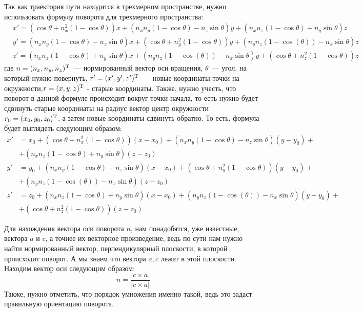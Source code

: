 \documentclass[a4paper,12pt]{article}
\begin{document}
Так как траектория пути находится в трехмерном пространстве, нужно использовать формулу поворота для трехмерного пространства:
\begin{align*}\label{rotation_formula}
        &x' = (\cos{\theta} + n_x^2(1-\cos{\theta}))x + (n_x n_y (1-\cos{\theta}) - n_z\sin{\theta})y + (n_x n_z(1-\cos{\theta}) + n_y \sin{\theta})z \\
        &y' = (n_x n_y (1-\cos{\theta}) - n_z\sin{\theta})x + (\cos{\theta} + n_y^2(1-\cos{\theta}))y + (n_y n_z(1-\cos(\theta)) - n_x\sin{\theta})z\\
        &z' = (n_x n_z(1-\cos{\theta}) + n_y \sin{\theta})x + (n_y n_z(1-\cos(\theta)) - n_x\sin{\theta})y + (\cos{\theta} + n_z^2(1-\cos{\theta}))z
\end{align*}
где $n = (n_x,n_y,n_z)^\text{\textup{T}}$~--- нормированный вектор оси вращения, $\theta$~--- угол, на который нужно повернуть, $r' = (x',y',z')^\text{\textup{T}}$~--- новые координаты точки на окружности,$r=(x,y,z)^\text{\textup{T}}$ - старые координаты. Также, нужно учесть, что поворот в данной формуле происходит вокруг точки начала, то есть нужно будет сдвинуть старые координаты на радиус вектор центр окружности $r_0=(x_0,y_0,z_0)^\text{\textup{T}}$, а затем новые координаты сдвинуть обратно. То есть, формула будет выглядеть следующим образом:
\begin{align*}
        x' &= x_0 + (\cos{\theta} + n_x^2(1-\cos{\theta}))(x-x_0) + (n_x n_y (1-\cos{\theta}) - n_z\sin{\theta})(y - y_0)+{} \\ 
        & + (n_x n_z(1-\cos{\theta}) + n_y \sin{\theta})(z-z_0) \\
        y' &= y_0 + (n_x n_y (1-\cos{\theta}) - n_z\sin{\theta})(x - x_0) + (\cos{\theta} + n_y^2(1-\cos{\theta}))(y - y_0)+{} \\ 
        &+ (n_y n_z(1-\cos(\theta)) - n_x\sin{\theta})(z - z_0)\\
        z' &= z_0 + (n_x n_z(1-\cos{\theta}) + n_y \sin{\theta})(x - x_0) + (n_y n_z(1-\cos(\theta)) - n_x\sin{\theta})(y-y_0) +{} \\&+ (\cos{\theta} + n_z^2(1-\cos{\theta}))(z - z_0)
\end{align*}

Для нахождения вектора оси поворота $n$, нам понадобятся, уже известные, вектора $a$ и $c$, а точнее их векторное произведение, ведь по сути нам нужно найти нормированный вектор, перпендикулярный плоскости, в которой происходит поворот. А мы знаем что вектора $a,c$ лежат в этой плоскости. Находим вектор оси следующим образом:
$$n=\frac{c\times a}{|c\times a|}$$
Также, нужно отметить, что порядок умножения именно такой, ведь это задаст правильную ориентацию поворота.
\end{document}
